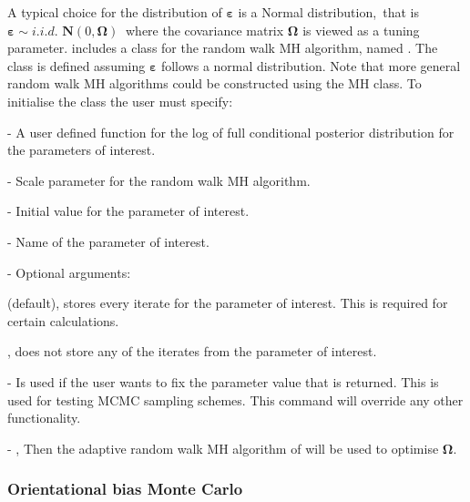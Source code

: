 \documentclass[article]{jss}
\begin{document}
A typical choice for the distribution of $\bm{\bm{\varepsilon}}$ is a
Normal distribution,\emph{\ }that is $\bm{\varepsilon\sim}i.i.d.$
$\bm{N}\left(0,\bm{\Omega}\right)\ $ where the covariance matrix
$\bm{\Omega}$ is viewed as a tuning parameter.  includes a
class for the random walk MH algorithm, named . The class
 is defined assuming $\bm{\varepsilon}$ follows a normal
distribution. Note that more general random walk MH algorithms could
be constructed using the MH class. To initialise the class the user
must specify:
\begin{description}
\item {} - A user defined function for the log of full
  conditional posterior distribution for the parameters of interest.
\item {} - Scale parameter for the random walk MH algorithm.
\item {} - Initial value for the parameter of interest.
\item {} - Name of the parameter of interest.
\item {} - Optional arguments:

  \begin{description}
  \item {}
    \begin{description}
    \item {} (default), stores every iterate for the
      parameter of interest. This is required for certain
      calculations.
    \item {}, does not store any of the iterates from the
      parameter of interest.
    \end{description}
  \item {} - Is used if the user wants to fix the
    parameter value that is returned. This is used for testing MCMC
    sampling schemes.  This command will override any other
    functionality.
  \item {} - , Then the adaptive random walk
    MH algorithm of \citet{GarthwaiteYanScisson2010} will be used to
    optimise $\bm{\Omega}.$
  \end{description}
\end{description}

\subsubsection{Orientational bias Monte Carlo}
\end{document}
